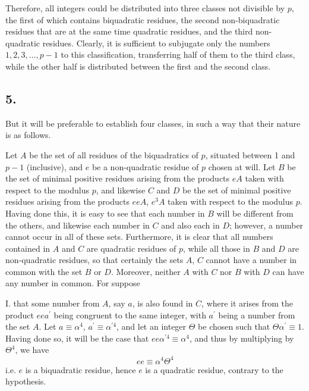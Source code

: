 \documentclass[twoside,12pt, showframe]{memoir}
\begin{document}
Therefore, all integers could be distributed into three classes not divisible by \(p\), the first of which contains biquadratic residues, the second non-biquadratic residues that are at the same time quadratic residues, and the third non-quadratic residues. Clearly, it is sufficient to subjugate only the numbers \(1, 2, 3, \ldots, p-1\) to this classification, transferring half of them to the third class, while the other half is distributed between the first and the second class.
%

\subsection*{5.}

But it will be preferable to establish four classes, in such a way that their nature is as follows.

Let \(A\) be the set of all residues of the biquadratics of \(p\), situated between 1 and \(p-1\) (inclusive), and \(e\) be a non-quadratic residue of \(p\) chosen at will. Let \(B\) be the set of minimal positive residues arising from the products \(e A\) taken with respect to the modulus \(p\), and likewise \(C\) and \(D\) be the set of minimal positive residues arising from the products \(e e A\), \(e^{3} A\) taken with respect to the modulus \(p\). Having done this, it is easy to see that each number in \(B\) will be different from the others, and likewise each number in \(C\) and also each in \(D\); however, a number cannot occur in all of these sets. Furthermore, it is clear that all numbers contained in \(A\) and \(C\) are quadratic residues of \(p\), while all those in \(B\) and \(D\) are non-quadratic residues, so that certainly the sets \(A\), \(C\) cannot have a number in common with the set \(B\) or \(D\). Moreover, neither \(A\) with \(C\) nor \(B\) with \(D\) can have any number in common. For suppose

I. that some number from \(A\), say \(a\), is also found in \(C\), where it arises from the product \(e e a^{\prime}\) being congruent to the same integer, with \(a^{\prime}\) being a number from the set \(A\). Let \(a \equiv \alpha^{4}\), \(a^{\prime} \equiv \alpha^{\prime 4}\), and let an integer \(\Theta\) be chosen such that \(\Theta \alpha^{\prime} \equiv 1\). Having done so, it will be the case that \(e e \alpha^{\prime 4} \equiv \alpha^{4}\), and thus by multiplying by \(\Theta^{4}\), we have
\[e e \equiv \alpha^{4} \Theta^{4}\]
i.e. \(e\) is a biquadratic residue, hence \(e\) is a quadratic residue, contrary to the hypothesis.
\end{document}
